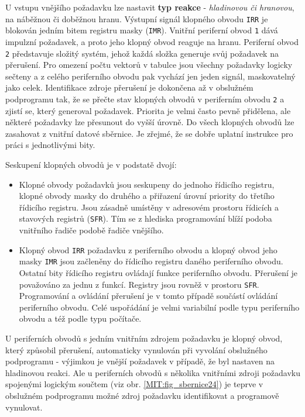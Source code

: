       U vstupu vnějšího požadavku lze nastavit \textbf{typ reakce} - \emph{hladinovou či hranovou}, 
      na náběžnou či doběžnou hranu. Výstupní signál klopného obvodu \texttt{IRR} je blokován 
      jedním bitem registru masky (\texttt{IMR}). Vnitřní periferní obvod \texttt{1} dává impulzní 
      požadavek, a proto jeho klopný obvod reaguje na hranu. Periferní obvod \texttt{2} představuje 
      složitý systém, jehož každá složka generuje svůj požadavek na přerušení. Pro omezení počtu 
      vektorů v tabulce jsou všechny požadavky logicky sečteny a z celého periferního obvodu pak 
      vychází jen jeden signál, maskovatelný jako celek. Identifikace zdroje přerušení je dokončena 
      až v obslužném podprogramu tak, že se přečte stav klopných obvodů v periferním obvodu 
      \texttt{2} a zjistí se, který generoval požadavek. Priorita je velmi často pevně přidělena, 
      ale některé požadavky lze přesunout do vyšší úrovně. Do všech klopných obvodů lze zasahovat z 
      vnitřní datové sběrnice. Je zřejmé, že se dobře uplatní instrukce pro práci s jednotlivými 
      bity.
        
      Seskupení klopných obvodů je v podstatě dvojí:
      \begin{itemize}[noitemsep]
        \item Klopné obvody požadavků jsou seskupeny do jednoho řídicího registru, klopné obvody    
              masky do druhého a přiřazení úrovní priority do třetího řídicího registru. Jsou 
              zásadně umístěny v adresovém prostoru řídicích a stavových registrů (\texttt{SFR}). 
              Tím se z hlediska programování blíží podoba vnitřního řadiče podobě řadiče vnějšího.
        \item Klopný obvod \texttt{IRR} požadavku z periferního obvodu a klopný obvod jeho masky    
              \texttt{IMR} jsou začleněny do řídicího registru daného periferního obvodu. Ostatní 
              bity řídicího registru ovládají funkce periferního obvodu. Přerušení je považováno za 
              jednu z funkcí. Registry jsou rovněž v prostoru \texttt{SFR}. Programování a ovládání 
              přerušení je v tomto případě součástí ovládání periferního obvodu. Celé uspořádání je 
              velmi variabilní podle typu periferního obvodu a též podle 
        typu počítače.
      \end{itemize}

      U periferních obvodů s jedním vnitřním zdrojem požadavku je klopný obvod, který způsobil 
      přerušení, automaticky vynulován při vyvolání obslužného podprogramu - výjimkou je vnější 
      požadavek v případě, že byl nastaven na hladinovou reakci. Ale u periferních obvodů s 
      několika vnitřními zdroji požadavku spojenými logickým součtem (viz obr. 
      \ref{MIT:fig_sbernice24}) je teprve v obslužném podprogramu možné zdroj požadavku 
      identifikovat a programově vynulovat.
      
